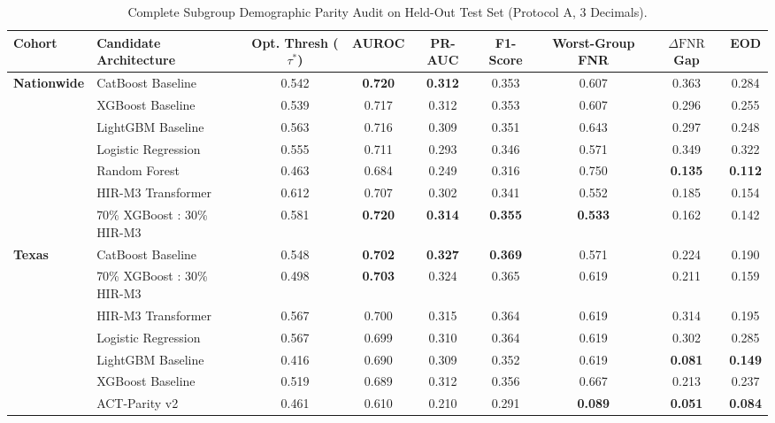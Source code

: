 \documentclass[10pt,journal]{IEEEtran}
\begin{document}
\begin{table}[!t]
\caption{Complete Subgroup Demographic Parity Audit on Held-Out Test Set (Protocol A, 3 Decimals).}
\label{tab:s_fairness}
\centering
\footnotesize
\begin{tabular}{llccccccc}
\toprule
\textbf{Cohort} & \textbf{Candidate Architecture} & \textbf{Opt. Thresh ($\tau^*$)} & \textbf{AUROC} & \textbf{PR-AUC} & \textbf{F1-Score} & \textbf{Worst-Group FNR} & \textbf{$\Delta\text{FNR}$ Gap} & \textbf{EOD} \\
\midrule
\textbf{Nationwide} & CatBoost Baseline & 0.542 & \textbf{0.720} & \textbf{0.312} & 0.353 & 0.607 & 0.363 & 0.284 \\
 & XGBoost Baseline & 0.539 & 0.717 & 0.312 & 0.353 & 0.607 & 0.296 & 0.255 \\
 & LightGBM Baseline & 0.563 & 0.716 & 0.309 & 0.351 & 0.643 & 0.297 & 0.248 \\
 & Logistic Regression & 0.555 & 0.711 & 0.293 & 0.346 & 0.571 & 0.349 & 0.322 \\
 & Random Forest & 0.463 & 0.684 & 0.249 & 0.316 & 0.750 & \textbf{0.135} & \textbf{0.112} \\
 & HIR-M3 Transformer & 0.612 & 0.707 & 0.302 & 0.341 & 0.552 & 0.185 & 0.154 \\
 & 70\% XGBoost : 30\% HIR-M3 & 0.581 & \textbf{0.720} & \textbf{0.314} & \textbf{0.355} & \textbf{0.533} & 0.162 & 0.142 \\
\midrule
\textbf{Texas} & CatBoost Baseline & 0.548 & \textbf{0.702} & \textbf{0.327} & \textbf{0.369} & 0.571 & 0.224 & 0.190 \\
 & 70\% XGBoost : 30\% HIR-M3 & 0.498 & \textbf{0.703} & 0.324 & 0.365 & 0.619 & 0.211 & 0.159 \\
 & HIR-M3 Transformer & 0.567 & 0.700 & 0.315 & 0.364 & 0.619 & 0.314 & 0.195 \\
 & Logistic Regression & 0.567 & 0.699 & 0.310 & 0.364 & 0.619 & 0.302 & 0.285 \\
 & LightGBM Baseline & 0.416 & 0.690 & 0.309 & 0.352 & 0.619 & \textbf{0.081} & \textbf{0.149} \\
 & XGBoost Baseline & 0.519 & 0.689 & 0.312 & 0.356 & 0.667 & 0.213 & 0.237 \\
 & ACT-Parity v2 & 0.461 & 0.610 & 0.210 & 0.291 & \textbf{0.089} & \textbf{0.051} & \textbf{0.084} \\
\bottomrule
\end{tabular}
\end{table}
\end{document}
